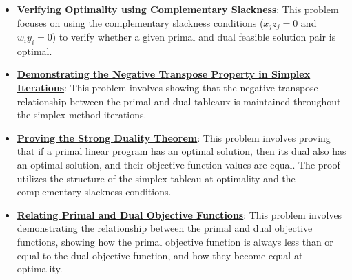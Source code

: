 \documentclass{article}%
\begin{document}
\begin{itemize}[leftmargin=*]%
\item \href{https://www.math.purdue.edu/~yipn/421/2024-09-12-Duality.pdf#page=21}{\textbf{Verifying Optimality using Complementary Slackness}}: This problem focuses on using the complementary slackness conditions ($x_j z_j = 0$ and $w_i y_i = 0$) to verify whether a given primal and dual feasible solution pair is optimal.%
\item \href{https://www.math.purdue.edu/~yipn/421/2024-09-12-Duality.pdf#page=6}{\textbf{Demonstrating the Negative Transpose Property in Simplex Iterations}}: This problem involves showing that the negative transpose relationship between the primal and dual tableaux is maintained throughout the simplex method iterations.%
\item \href{https://www.math.purdue.edu/~yipn/421/2024-09-12-Duality.pdf#page=11}{\textbf{Proving the Strong Duality Theorem}}: This problem involves proving that if a primal linear program has an optimal solution, then its dual also has an optimal solution, and their objective function values are equal. The proof utilizes the structure of the simplex tableau at optimality and the complementary slackness conditions.%
\item \href{https://www.math.purdue.edu/~yipn/421/2024-09-12-Duality.pdf#page=22}{\textbf{Relating Primal and Dual Objective Functions}}: This problem involves demonstrating the relationship between the primal and dual objective functions, showing how the primal objective function is always less than or equal to the dual objective function, and how they become equal at optimality.%
\end{itemize}

%
\end{document}
